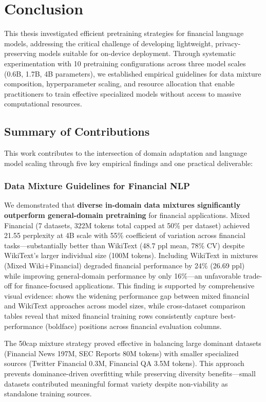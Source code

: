 \chapter{Conclusion}

This thesis investigated efficient pretraining strategies for financial language models, addressing the critical challenge of developing lightweight, privacy-preserving models suitable for on-device deployment. Through systematic experimentation with 10 pretraining configurations across three model scales (0.6B, 1.7B, 4B parameters), we established empirical guidelines for data mixture composition, hyperparameter scaling, and resource allocation that enable practitioners to train effective specialized models without access to massive computational resources.

\section{Summary of Contributions}

This work contributes to the intersection of domain adaptation and language model scaling through five key empirical findings and one practical deliverable:

\subsection{Data Mixture Guidelines for Financial NLP}

We demonstrated that \textbf{diverse in-domain data mixtures significantly outperform general-domain pretraining} for financial applications. Mixed Financial (7 datasets, 322M tokens total capped at 50\% per dataset) achieved 21.55 perplexity at 4B scale with 55\% coefficient of variation across financial tasks—substantially better than WikiText (48.7 ppl mean, 78\% CV) despite WikiText's larger individual size (100M tokens). Including WikiText in mixtures (Mixed Wiki+Financial) degraded financial performance by 24\% (26.69 ppl) while improving general-domain performance by only 16\%—an unfavorable trade-off for finance-focused applications. This finding is supported by comprehensive visual evidence:  shows the widening performance gap between mixed financial and WikiText approaches across model sizes, while cross-dataset comparison tables reveal that mixed financial training rows consistently capture best-performance (boldface) positions across financial evaluation columns.

The 50cap mixture strategy proved effective in balancing large dominant datasets (Financial News 197M, SEC Reports 80M tokens) with smaller specialized sources (Twitter Financial 0.3M, Financial QA 3.5M tokens). This approach prevents dominance-driven overfitting while preserving diversity benefits—small datasets contributed meaningful format variety despite non-viability as standalone training sources.

